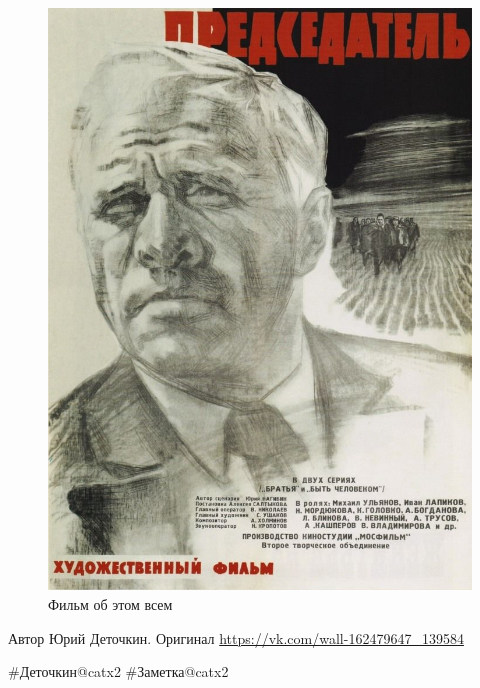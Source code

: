 \begin{figure}[h!tb] 
	\centering\includegraphics[scale=0.4]{Orlovskiy/CdCLdInaVq8.jpg}
	\caption{Фильм об этом всем}%
\end{figure}


Автор Юрий Деточкин.  Оригинал \url{https://vk.com/wall-162479647_139584}

\#Деточкин@catx2
\#Заметка@catx2

